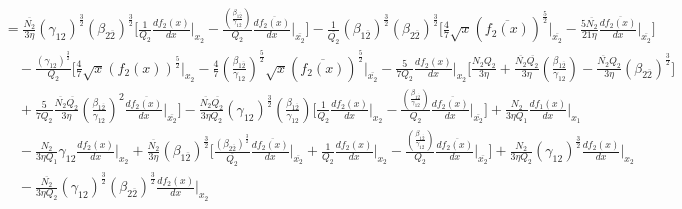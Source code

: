 \documentclass[fleqn, 10pt]{article}
\begin{document}
            \begin{equation*}
            \begin{split}
            &=  \frac{\overline{N_2}}{3 \eta} (\gamma_{12})^\frac{3}{2} (\beta_{2\overline{2}})^\frac{3}{2} \Biggl[ \frac{1}{Q_2}\frac{df_2(x)}{dx} \Bigg|_{x_2} -   \frac{\left(\frac{\beta_{1\overline{2}}}{\gamma_{12}}\right)}{Q_2} \frac{d\overline{f_2(x)}}{dx} \Bigg|_{\overline{x_2}}\Biggr] - \frac{1}{\overline{Q_2}}(\beta_{1\overline{2}})^\frac{3}{2} (\beta_{2\overline{2}})^\frac{3}{2} \Biggl[  \frac{4}{7} \sqrt{x} (\overline{f_2(x)})^\frac{5}{2} \Bigg|_{\overline{x_2}} -  \frac{5 \overline{N_2}}{21 \eta} \frac{d\overline{f_2(x)}}{dx} \Bigg|_{\overline{x_2}} \Biggr] \\ & \quad -   \frac{(\gamma_{12})^\frac{3}{2}}{Q_2} \Biggl[ \frac{4}{7} \sqrt{x} (f_2(x))^\frac{5}{2} \Bigg|_{x_2} -   \frac{4}{7} \left(\frac{\beta_{1\overline{2}}}{\gamma_{12}}\right)^\frac{5}{2} \sqrt{x} (\overline{f_2(x)})^\frac{5}{2} \Bigg|_{\overline{x_2}} -   \frac{5}{7 Q_2} \frac{df_2(x)}{dx}\Bigg|_{x_2} \Biggl[\frac{N_2Q_2}{3 \eta} + \frac{\overline{N_2}\overline{Q_2}}{3 \eta} \left(\frac{\beta_{1\overline{2}}}{\gamma_{12}}\right) - \frac{\overline{N_2}Q_2}{3 \eta}(\beta_{2\overline{2}})^\frac{3}{2} \Biggr] \\ & \quad +  \frac{5}{7Q_2} \frac{\overline{N_2}\overline{Q_2}}{3 \eta}  \left(\frac{\beta_{1\overline{2}}}{\gamma_{12}}\right)^2 \frac{d\overline{f_2(x)}}{dx}\Bigg|_{\overline{x_2}} \Biggr] -   \frac{\overline{N_2}\overline{Q_2}}{3 \eta Q_2} (\gamma_{12})^\frac{3}{2} \left(\frac{\beta_{1\overline{2}}}{\gamma_{12}}\right) \Biggl[ \frac{1}{Q_2} \frac{df_2(x)}{dx}\Bigg|_{x_2} -  \frac{\left(\frac{\beta_{1\overline{2}}}{\gamma_{12}}\right)}{Q_2} \frac{d\overline{f_2(x)}}{dx}\Bigg|_{\overline{x_2}}\Biggr] +   \frac{N_2}{3 \eta Q_1} \frac{df_1(x)}{dx} \Bigg|_{x_1} \\ & \quad -   \frac{N_2}{3 \eta Q_1} \gamma_{12} \frac{df_2(x)}{dx} \Bigg|_{x_2} +   \frac{\overline{N_2}}{3 \eta} (\beta_{1\overline{2}})^\frac{3}{2} \Biggl[ \frac{(\beta_{2\overline{2}})^\frac{3}{2}}{\overline{Q_2}} \frac{d\overline{f_2(x)}}{dx}\Bigg|_{\overline{x_2}} +   \frac{1}{Q_2} \frac{df_2(x)}{dx} \Bigg|_{x_2} -   \frac{\left(\frac{\beta_{1\overline{2}}}{\gamma_{12}}\right)}{Q_2} \frac{d\overline{f_2(x)}}{dx} \Bigg|_{\overline{x_2}} \Biggr] +   \frac{N_2}{3 \eta Q_2} (\gamma_{12})^\frac{3}{2} \frac{df_2(x)}{dx}\Bigg|_{x_2} \\ & \quad -   \frac{\overline{N_2}}{3 \eta Q_2} (\gamma_{12})^\frac{3}{2} (\beta_{2\overline{2}})^\frac{3}{2} \frac{df_2(x)}{dx}\Bigg|_{x_2}
            \end{split}
            \end{equation*}
\end{document}
